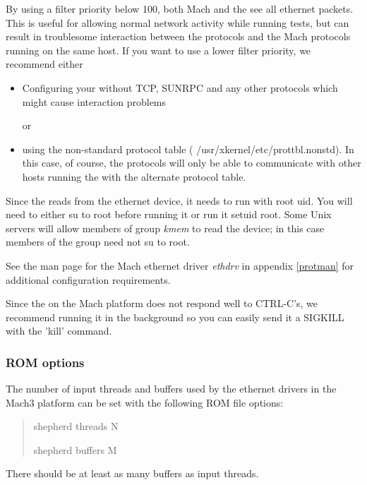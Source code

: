 By using a filter priority below 100, both Mach and the \xk{} see all
ethernet packets.  This is useful for allowing normal network activity
while running \xk{} tests, but can result in troublesome interaction
between the \xk{} protocols and the Mach protocols running on the same
host.  If you want to use a lower filter priority, we recommend either

\begin{itemize}

\item
Configuring your \xk{} without TCP, SUNRPC and any other protocols
which might cause interaction problems

or

\item
using the non-standard protocol table ({\sanss
/usr/xkernel/etc/prottbl.nonstd}). 
In this case,
of course, the \xk{} protocols will only be able to communicate with
other hosts running the \xk{} with the alternate protocol table.

\end{itemize}

Since the \xk{} reads from the ethernet device, it needs to run with
root uid.  You will need to either su to root before running it or run
it setuid root.  Some Unix servers will allow members of group {\em
kmem} to read the device; in this case members of the group need not
su to root.

See the man page for the Mach ethernet driver {\em ethdrv} in appendix
\ref{protman} for
additional configuration requirements.

Since the \xk{} on the Mach platform does not respond well to
CTRL-C's, we recommend running it in the background so you can easily
send it a SIGKILL with the 'kill' command.

\subsubsection{ROM options}

The number of input threads and buffers used by the ethernet drivers
in the Mach3 platform can be set with the following ROM file options:

\begin{quote}
\begin{tt}
shepherd threads N

shepherd buffers M
\end{tt}
\end{quote}

\noindent
There should be at least as many buffers as input threads.


